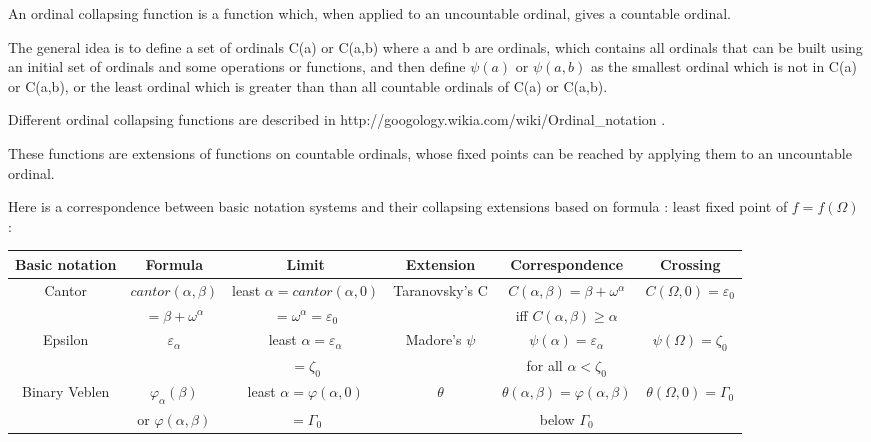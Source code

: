\documentclass[10pt]{article}
\begin{document}
An ordinal collapsing function is a function which, when applied to an uncountable ordinal, gives a countable ordinal.

The general idea is to define a set of ordinals C(a) or C(a,b) where a and b are ordinals, which contains all ordinals that can be built using an initial set of ordinals and some operations or functions, and then define \( \psi(a) \) or \( \psi(a,b) \) as the smallest ordinal which is not in C(a) or C(a,b), or the least ordinal which is greater than than all countable ordinals of C(a) or C(a,b).

Different ordinal collapsing functions are described in http://googology.wikia.com/wiki/Ordinal\_notation .

These functions are extensions of functions on countable ordinals, whose fixed points can be reached by applying them to an uncountable ordinal.

Here is a correspondence between basic notation systems and their collapsing extensions based on formula : least fixed point of \( f = f(\Omega) \) :

\bigskip

\begin{tabular}{|c|c|c|c|c|c|} \hline
Basic notation	& Formula			& Limit					& Extension		& Correspondence					& Crossing 				\\ \hline
Cantor		& \( cantor(\alpha,\beta) \)	& least \( \alpha = cantor(\alpha,0) \)	& Taranovsky's C	& \( C(\alpha,\beta) = \beta+\omega^\alpha \)		& \( C(\Omega,0) = \varepsilon_0 \)	\\
		& \( = \beta + \omega^\alpha \)	& \( = \omega^\alpha = \varepsilon_0 \)	&			& iff \( C(\alpha,\beta) \geq \alpha \)			&					\\ \hline
Epsilon		& \( \varepsilon_\alpha	\)	& least \( \alpha = \varepsilon_\alpha\)& Madore's \( \psi \)	& \( \psi(\alpha) = \varepsilon_\alpha \)		& \( \psi(\Omega) = \zeta_0 \)		\\
		&				& \( = \zeta_0 \)			&			& for all \( \alpha < \zeta_0 \)			& 					\\ \hline
Binary Veblen	& \( \varphi_\alpha(\beta) \)	& least \( \alpha = \varphi(\alpha,0) \)& \( \theta \)		& \( \theta(\alpha,\beta) = \varphi(\alpha,\beta) \)	& \( \theta(\Omega,0) = \Gamma_0 \)	\\
		& or \( \varphi(\alpha,\beta) \)& \( = \Gamma_0 \)			&			& below \( \Gamma_0 \)					&					\\ \hline
													
\end{tabular}
\end{document}
